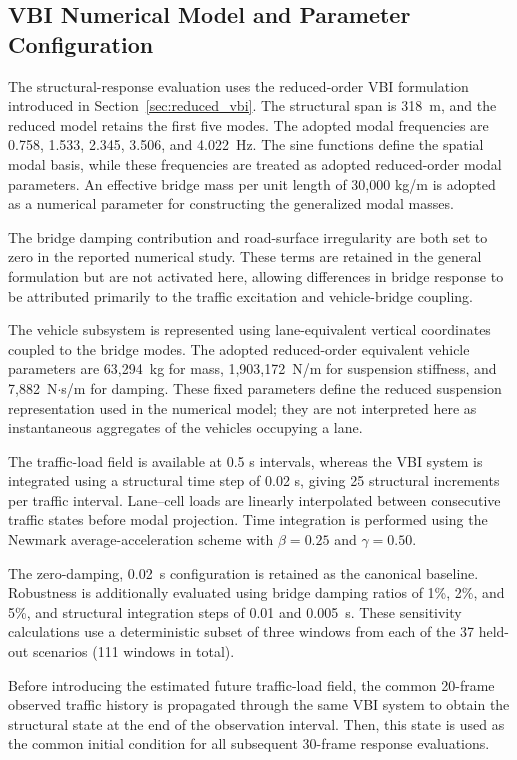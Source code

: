 \documentclass[journal]{IEEEtran}
\begin{document}
\subsection{VBI Numerical Model and Parameter Configuration}
\label{sec:vbi_configuration}

The structural-response
evaluation uses the reduced-order VBI formulation introduced in Section~\ref{sec:reduced_vbi}.
The structural span is 318~m, and the reduced model retains the first five modes. The adopted modal frequencies are 0.758, 1.533, 2.345, 3.506, and 4.022~Hz. The sine functions define the spatial modal basis, while these frequencies are treated as adopted reduced-order modal parameters. An effective bridge mass per unit length of 30,000 kg/m is
adopted as a numerical parameter for constructing the generalized modal masses.

The bridge damping
contribution and road-surface irregularity are both set to zero in the reported
numerical study. These terms are retained in the general formulation but are
not activated here, allowing differences in bridge response to be attributed primarily
to the traffic excitation and vehicle-bridge coupling.

The vehicle subsystem
is represented using lane-equivalent vertical coordinates coupled to the bridge
modes. The adopted reduced-order equivalent vehicle parameters are 63,294~kg for mass, 1,903,172~N/m for suspension stiffness, and 7,882~N$\cdot$s/m for damping. These fixed parameters define the reduced suspension representation used in the numerical model; they are not interpreted here as instantaneous aggregates of the vehicles occupying a lane.

The traffic-load field
is available at 0.5 s intervals, whereas the VBI system is integrated using a
structural time step of 0.02 s, giving 25 structural increments per traffic
interval. Lane--cell loads are linearly interpolated between consecutive traffic
states before modal projection. Time integration is performed using the Newmark
average-acceleration scheme with $\beta=0.25$ and $\gamma=0.50$.

The zero-damping, 0.02~s configuration is retained as the canonical baseline. Robustness is additionally evaluated using bridge damping ratios of 1\%, 2\%, and 5\%, and structural integration steps of 0.01 and 0.005~s. These sensitivity calculations use a deterministic subset of three windows from each of the 37 held-out scenarios (111 windows in total).

Before introducing the
estimated future traffic-load field, the common 20-frame observed traffic
history is propagated through the same VBI system to obtain the structural
state at the end of the observation interval. Then, this state is used as the
common initial condition for all subsequent 30-frame response evaluations.
\end{document}
